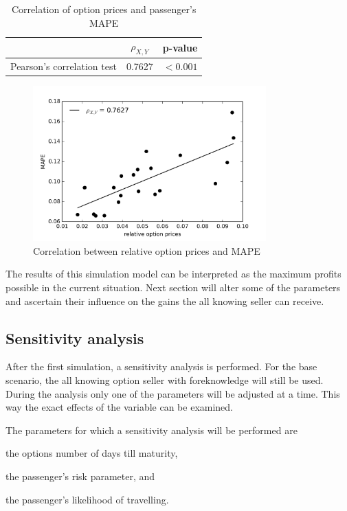

\begin{table}
\centering
\begin{tabular}{l c c}
\toprule
~  &  $\rho_{X,Y}$  &  p-value   \\
\midrule
Pearson's correlation test &  0.7627  &  $< 0.001$ \\
\bottomrule
\end{tabular}
\caption{Correlation of option prices and passenger's MAPE}
\label{tbl:pearsonPricesMAPE}
\end{table}


\begin{figure}
    \centering
    \includegraphics[width=0.8\textwidth]{figures/correlation_optionPrices-MAPE}
    \caption{Correlation between relative option prices and MAPE}
    \label{fig:optionPricesMAPE}
\end{figure}


The results of this simulation model can be interpreted as the maximum profits possible in the current situation. Next section will alter some of the parameters and ascertain their influence on the gains the all knowing seller can receive.


\subsection{Sensitivity analysis}
After the first simulation, a sensitivity analysis is performed. For the base scenario, the all knowing option seller with foreknowledge will still be used. During the analysis only one of the parameters will be adjusted at a time. This way the exact effects of the variable can be examined.

The parameters for which a sensitivity analysis will be performed are \begin{inparaenum}
    \item the options number of days till maturity,
    \item the passenger's risk parameter, and
    \item the passenger's likelihood of travelling.
\end{inparaenum}

